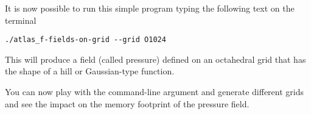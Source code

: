It is now possible to run this simple program typing
the following text on the terminal
%
\begin{lstlisting}[style=BashStyle]
./atlas_f-fields-on-grid --grid O1024
\end{lstlisting}
% 
This will produce a field (called pressure) defined 
on an octahedral grid that has the shape of a hill 
or Gaussian-type function.

You can now play with the command-line argument and 
generate different grids and see the impact on the 
memory footprint of the pressure field.